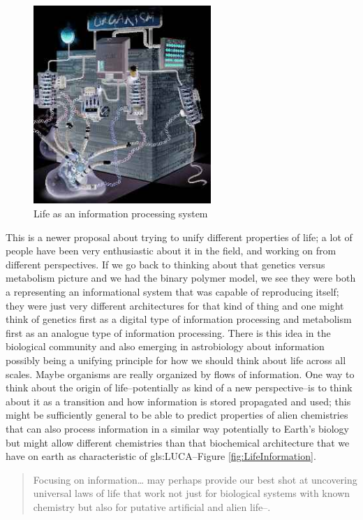 \documentclass[]{article}
\begin{document}
\begin{figure}[H]
	\begin{center}
		\caption[Life as an information processing system]{Life as an information processing system\cite{nurse2008life}}\label{fig:nurse-information}
		\includegraphics[width=0.6\textwidth]{nurse-information}
	\end{center}
\end{figure}


This is a newer proposal about trying to unify different properties of life;  a lot of people have been very enthusiastic about it in the field, and working on from different perspectives. If we go back to thinking about that genetics versus metabolism picture and we had the binary polymer model, we see they were both a representing an informational system that was capable of reproducing itself; they were just very different architectures for that kind of thing and one might think of genetics first as a
digital type of information processing and metabolism first as an analogue type of information processing. There is this idea in the biological community and also emerging in astrobiology about information possibly being a unifying principle for how we
should think about life across all scales.  Maybe organisms are really organized by flows of information.
One way to think about the origin of life--potentially as kind of a new perspective--is to think about it as a transition and how information is stored propagated and used; this might be sufficiently general to be able to predict properties of alien chemistries
that can also process information in a similar way potentially to Earth's biology but might allow different chemistries than that biochemical architecture that we have on earth as characteristic of \gls{gls:LUCA}--Figure \ref{fig:LifeInformation}.
\begin{quotation}
	Focusing on information… may perhaps provide our best shot at uncovering universal laws of life that work not just for biological systems with known chemistry but also for putative artificial and alien life--\cite{cronin2016beyond}.
\end{quotation}
\end{document}
